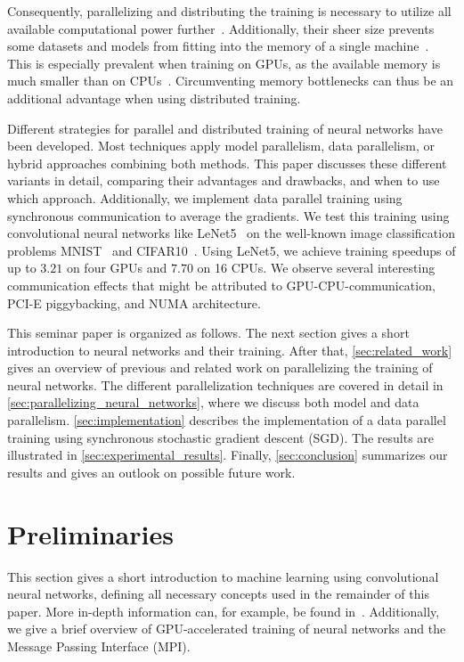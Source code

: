 \documentclass[conference]{IEEEtran}
\begin{document}
Consequently, parallelizing and distributing the training is necessary to utilize all available computational power further~\cite{jiang2018-FiLayer,recht2011-Hogwild}.
Additionally, their sheer size prevents some datasets and models from fitting into the memory of a single machine~\cite{recht2011-Hogwild,dean2012-Large-scale-distributed}.
This is especially prevalent when training on GPUs, as the available memory is much smaller than on CPUs~\cite{dean2012-Large-scale-distributed}.
Circumventing memory bottlenecks can thus be an additional advantage when using distributed training.

Different strategies for parallel and distributed training of neural networks have been developed.
Most techniques apply model parallelism, data parallelism, or hybrid approaches combining both methods.
This paper discusses these different variants in detail, comparing their advantages and drawbacks, and when to use which approach.
Additionally, we implement data parallel training using synchronous communication to average the gradients.
We test this training using convolutional neural networks like LeNet5~\cite{lecun1998gradient} on the well-known image classification problems MNIST~\cite{lecun1998gradient} and \mbox{CIFAR10}~\cite{krizhevsky2009CIFAR10}.
Using LeNet5, we achieve training speedups of up to $3.21$ on four GPUs and $7.70$ on 16 CPUs.
We observe several interesting communication effects that might be attributed to GPU-CPU-communication, PCI-E piggybacking, and NUMA architecture.

This seminar paper is organized as follows.
The next section gives a short introduction to neural networks and their training.
After that, \autoref{sec:related_work} gives an overview of previous and related work on parallelizing the training of neural networks.
The different parallelization techniques are covered in detail in \autoref{sec:parallelizing_neural_networks}, where we discuss both model and data parallelism.
\autoref{sec:implementation} describes the implementation of a data parallel training using synchronous stochastic gradient descent (SGD).
The results are illustrated in \autoref{sec:experimental_results}.
Finally, \autoref{sec:conclusion} summarizes our results and gives an outlook on possible future work.


\section{Preliminaries} %
\label{sec:preliminaries}
This section gives a short introduction to machine learning using convolutional neural networks, defining all necessary concepts used in the remainder of this paper.
More in-depth information can, for example, be found in~\cite{goodfellow2016-DeepLearningBook}.
Additionally, we give a brief overview of GPU-accelerated training of neural networks and the Message Passing Interface (MPI).
\end{document}
